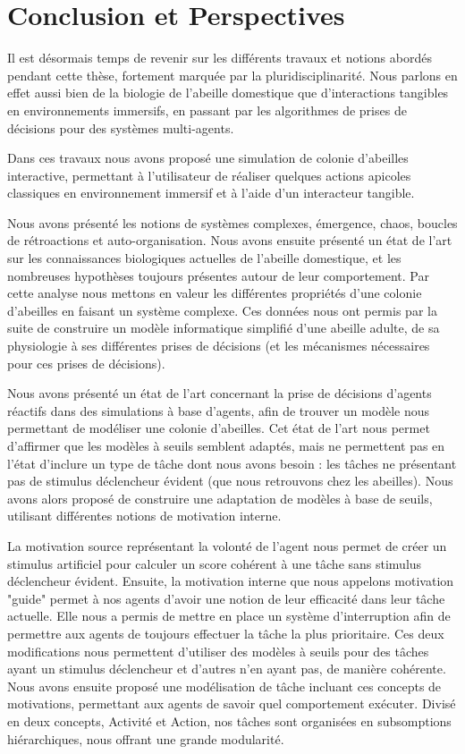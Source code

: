 \chapter*{Conclusion et Perspectives}

Il est désormais temps de revenir sur les différents travaux et notions abordés pendant cette thèse, fortement marquée par la pluridisciplinarité. Nous parlons en effet aussi bien de la biologie de l'abeille domestique que d'interactions tangibles en environnements immersifs, en passant par les algorithmes de prises de décisions pour des systèmes multi-agents.

Dans ces travaux nous avons proposé une simulation de colonie d'abeilles interactive, permettant à l'utilisateur de réaliser quelques actions apicoles classiques en environnement immersif et à l'aide d'un interacteur tangible.

Nous avons présenté les notions de systèmes complexes, émergence, chaos, boucles de rétroactions et auto-organisation. Nous avons ensuite présenté un état de l'art sur les connaissances biologiques actuelles de l'abeille domestique, et les nombreuses hypothèses toujours présentes autour de leur comportement. Par cette analyse nous mettons en valeur les différentes propriétés d'une colonie d'abeilles en faisant un système complexe. Ces données nous ont permis par la suite de construire un modèle informatique simplifié d'une abeille adulte, de sa physiologie à ses différentes prises de décisions (et les mécanismes nécessaires pour ces prises de décisions).

Nous avons présenté un état de l'art concernant la prise de décisions d'agents réactifs dans des simulations à base d'agents, afin de trouver un modèle nous permettant de modéliser une colonie d'abeilles. Cet état de l'art nous permet d'affirmer que les modèles à seuils semblent adaptés, mais ne permettent pas en l'état d'inclure un type de tâche dont nous avons besoin : les tâches ne présentant pas de stimulus déclencheur évident (que nous retrouvons chez les abeilles). Nous avons alors proposé de construire une adaptation de modèles à base de seuils, utilisant différentes notions de motivation interne.

La motivation source représentant la volonté de l'agent nous permet de créer un stimulus artificiel pour calculer un score cohérent à une tâche sans stimulus déclencheur évident. Ensuite, la motivation interne que nous appelons motivation "guide" permet à nos agents d'avoir une notion de leur efficacité dans leur tâche actuelle. Elle nous a permis de mettre en place un système d'interruption afin de permettre aux agents de toujours effectuer la tâche la plus prioritaire. Ces deux modifications nous permettent d'utiliser des modèles à seuils pour des tâches ayant un stimulus déclencheur et d'autres n'en ayant pas, de manière cohérente. Nous avons ensuite proposé une modélisation de tâche incluant ces concepts de motivations, permettant aux agents de savoir quel comportement exécuter. Divisé en deux concepts, Activité et Action, nos tâches sont organisées en subsomptions hiérarchiques, nous offrant une grande modularité.

